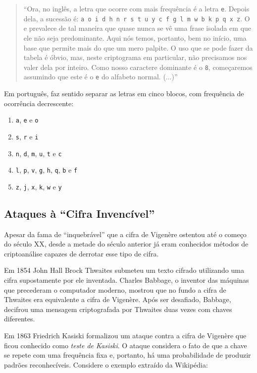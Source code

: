\begin{quote}
``Ora, no inglês, a letra que ocorre com mais frequência é a letra {\tt e}.
Depois dela, a sucessão é: {\tt a o i d h n r s t u y c f g l m w b k p q x z}.
O e prevalece de tal maneira que quase nunca se vê uma frase isolada em que ele não seja predominante.
Aqui nós temos, portanto, bem no início, uma base que permite mais do que um mero palpite.
O uso que se pode fazer da tabela é óbvio, mas, neste criptograma em particular, não precisamos nos valer dela por inteiro.
Como nosso caractere dominante é o {\tt 8}, começaremos assumindo que este é o {\tt e} do alfabeto normal. (...)''
\end{quote}

Em português, faz sentido separar as letras em cinco blocos, com frequência de ocorrência decrescente:
\begin{enumerate}
\item {\tt a}, {\tt e} e {\tt o}
\item {\tt s}, {\tt r} e {\tt i}
\item {\tt n}, {\tt d}, {\tt m}, {\tt u}, {\tt t} e {\tt c}
\item {\tt l}, {\tt p}, {\tt v}, {\tt g}, {\tt h}, {\tt q}, {\tt b} e {\tt f}
\item {\tt z}, {\tt j}, {\tt x}, {\tt k}, {\tt w} e {\tt y}
\end{enumerate}

\subsection{Ataques à ``Cifra Invencível''}
\label{sec:criptoanalise-vegenere}

Apesar da fama de ``inquebrável'' que a cifra de Vigenère ostentou até o começo do século XX, desde a metade do século anterior já eram conhecidos métodos de criptoanálise capazes de derrotar esse tipo de cifra.

Em 1854 John Hall Brock Thwaites submeteu um texto cifrado utilizando uma cifra supostamente por ele inventada.
Charles Babbage, o inventor das máquinas que precederam o computador moderno, mostrou que no fundo a cifra de Thwaites era equivalente a cifra de Vigenère.
Após ser desafiado, Babbage, decifrou uma mensagem criptografada por Thwaites duas vezes com chaves diferentes.

Em 1863 Friedrich Kasiski formalizou um ataque contra a cifra de Vigenère que ficou conhecido como {\em teste de Kasiski}.
O ataque considera o fato de que a chave se repete com uma frequência fixa e, portanto, há uma probabilidade de produzir padrões reconhecíveis.
Considere o exemplo extraído da Wikipédia:

